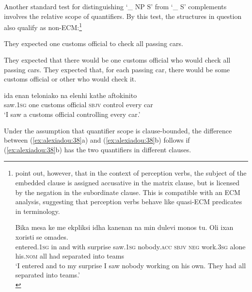 \documentclass[output=paper]{langsci/langscibook}
\begin{document}
Another standard test for distinguishing ‘\_ NP S' from ‘\_ S' complements involves the relative scope of quantifiers. By this test, the structures in question also qualify as non-ECM:\footnote{\citet{Alexiadou2016} point out, however, that in the context of perception verbs, the subject of the embedded clause is assigned accusative in the matrix clause, but is licensed by the negation in the subordinate clause. This is compatible with an ECM analysis, suggesting that perception verbs behave like quasi-ECM predicates in  terminology.

\ea \gll Bika  mesa    ke me     ekpliksi idha       kanenan         na min dulevi monos tu. Oli ixan             xoristi      se omades.\\
        entered{}.\textsc{1sg} in   and with   surprise saw{}.\textsc{1sg} nobody{}.\textsc{acc}  \textsc{sbjv}  \textsc{neg} work{}.\textsc{3sg} alone his.\textsc{nom}    all had separated into teams\\
    \glt ‘I entered and to my surprise I saw nobody working on his own. They had all separated into teams.’\\
\z
        }

\ea%
    \label{ex:alexiadou:38}
    \ea They expected one customs official to check all passing cars.\\
    \begin{xlisti}
    \ex They expected that there would be one customs official who would         check all passing cars.
    \ex They expected that, for each passing car, there would be some           customs official or other who would check it.  
    \end{xlisti}
    \ex 
    \gll ida          enan teloniako            na       elenhi   kathe  aftokinito\\
        saw{}.\textsc{1sg}   one   {customs official}  \textsc{sbjv} control  every  car\\
    \glt ‘I saw a customs official controlling every car.’
    \begin{xlisti}
    \end{xlisti}
    \z
\z

Under the assumption that quantifier scope is clause-bounded, the difference between (\ref{ex:alexiadou:38}a) and (\ref{ex:alexiadou:38}b) follows if (\ref{ex:alexiadou:38}b) has the two quantifiers in different clauses. 
\end{document}
